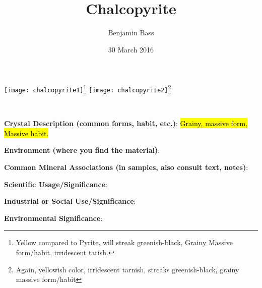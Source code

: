 \documentclass[10pt]{article}
\author{Benjamin Bass}
\date{30 March 2016}
\title{\vspace{-2.0cm}Chalcopyrite} %
\begin{document}
\maketitle


\begin{center}
  \texttt{[image: chalcopyrite1]}\footnote{Yellow compared to Pyrite, will streak greenish-black, Grainy Massive form/habit, irridescent tarish.}
  \texttt{[image: chalcopyrite2]}\footnote{Again, yellowish color, irridescent tarnish, streaks greenish-black, grainy massive form/habit}
\end{center}



\
\
\
\
\
\
\
\
\
\

\begin{framed}
  \textbf{Crystal Description (common forms, habit, etc.)}: \hl{Grainy, massive form, Massive habit.}
\end{framed}

\begin{framed}
  \textbf{Environment (where you find the material)}: 
\end{framed}

\begin{framed}
  \textbf{Common Mineral Associations (in samples, also consult text, notes)}: 
\end{framed}

\begin{framed}
  \textbf{Scientific Usage/Significance}: 
\end{framed}

\begin{framed}
  \textbf{Industrial or Social Use/Significance}: 
\end{framed}

\begin{framed}
  \textbf{Environmental Significance}: 
\end{framed}

\end{document}
